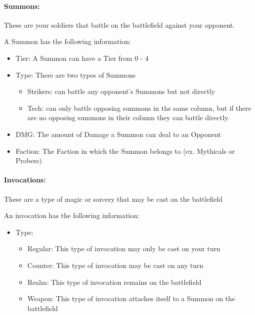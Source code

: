 \documentclass[12pt, letterpaper]{article}
\begin{document}
\paragraph{Summons: \\}
\par These are your soldiers that battle on the battlefield against your opponent. 
\par A Summon has the following information: 
\begin{itemize}
    \item Tier: A Summon can have a Tier from 0 - 4
    \item Type: There are two types of Summons 
    \begin{itemize}
        \item Strikers:  can battle any opponent's Summons but not directly
        \item Tech: can only battle opposing summons in the same column, but if there are no opposing summons in their column they can battle directly.
    \end{itemize}
    \item DMG: The amount of Damage a Summon can deal to an Opponent
    \item Faction: The Faction in which the Summon belongs to (ex. Mythicals or Probers)
\end{itemize}
\paragraph{Invocations: \\}
\par These are a type of magic or sorcery that may be cast on the battlefield 
\par An invocation has the following information: 
\begin{itemize}
    \item Type: 
    \begin{itemize}
        \item Regular: This type of invocation may only be cast on your turn 
        \item Counter: This type of invocation may be cast on any turn
        \item Realm: This type of invocation remains on the battlefield
        \item Weapon: This type of invocation attaches itself to a Summon on the battlefield
    \end{itemize}
\end{itemize}
\end{document}
